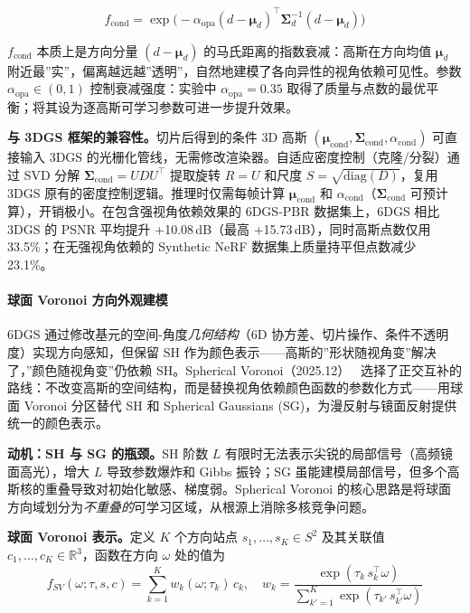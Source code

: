 \begin{equation}
f_\text{cond} = \exp\!\bigl(-\alpha_\text{opa}(d - \boldsymbol{\mu}_d)^\top \boldsymbol{\Sigma}_d^{-1}(d - \boldsymbol{\mu}_d)\bigr)
\end{equation}

$f_\text{cond}$ 本质上是方向分量 $(d - \boldsymbol{\mu}_d)$ 的马氏距离的指数衰减：高斯在方向均值 $\boldsymbol{\mu}_d$ 附近最”实”，偏离越远越”透明”，自然地建模了各向异性的视角依赖可见性。参数 $\alpha_\text{opa}\in(0,1)$ 控制衰减强度：实验中 $\alpha_\text{opa} = 0.35$ 取得了质量与点数的最优平衡；将其设为逐高斯可学习参数可进一步提升效果。

\textbf{与 3DGS 框架的兼容性。}切片后得到的条件 3D 高斯 $(\boldsymbol{\mu}_\text{cond}, \boldsymbol{\Sigma}_\text{cond}, \alpha_\text{cond})$ 可直接输入 3DGS 的光栅化管线，无需修改渲染器。自适应密度控制（克隆/分裂）通过 SVD 分解 $\boldsymbol{\Sigma}_\text{cond} = UDU^\top$ 提取旋转 $R = U$ 和尺度 $S = \sqrt{\text{diag}(D)}$，复用 3DGS 原有的密度控制逻辑。推理时仅需每帧计算 $\boldsymbol{\mu}_\text{cond}$ 和 $\alpha_\text{cond}$（$\boldsymbol{\Sigma}_\text{cond}$ 可预计算），开销极小。在包含强视角依赖效果的 6DGS-PBR 数据集上，6DGS 相比 3DGS 的 PSNR 平均提升 +10.08\,dB（最高 +15.73\,dB），同时高斯点数仅用 33.5\%；在无强视角依赖的 Synthetic NeRF 数据集上质量持平但点数减少 23.1\%。

\paragraph{球面 Voronoi 方向外观建模}

6DGS 通过修改基元的空间-角度\emph{几何结构}（6D 协方差、切片操作、条件不透明度）实现方向感知，但保留 SH 作为颜色表示——高斯的”形状随视角变”解决了，”颜色随视角变”仍依赖 SH。Spherical Voronoi（2025.12）~\cite{2512_14180} 选择了正交互补的路线：不改变高斯的空间结构，而是替换视角依赖颜色函数的参数化方式——用球面 Voronoi 分区替代 SH 和 Spherical Gaussians (SG)，为漫反射与镜面反射提供统一的颜色表示。

\textbf{动机：SH 与 SG 的瓶颈。}SH 阶数 $L$ 有限时无法表示尖锐的局部信号（高频镜面高光），增大 $L$ 导致参数爆炸和 Gibbs 振铃；SG 虽能建模局部信号，但多个高斯核的重叠导致对初始化敏感、梯度弱。Spherical Voronoi 的核心思路是将球面方向域划分为\emph{不重叠的}可学习区域，从根源上消除多核竞争问题。

\textbf{球面 Voronoi 表示。}定义 $K$ 个方向站点 $s_1,\ldots,s_K\in S^2$ 及其关联值 $c_1,\ldots,c_K\in\mathbb{R}^3$，函数在方向 $\omega$ 处的值为
\begin{equation}
f_{SV}(\omega;\tau,s,c) = \sum_{k=1}^{K} w_k(\omega;\tau_k)\, c_k, \quad w_k = \frac{\exp(\tau_k\, s_k^\top\omega)}{\sum_{k'=1}^{K}\exp(\tau_{k'}\, s_{k'}^\top\omega)}
\end{equation}

